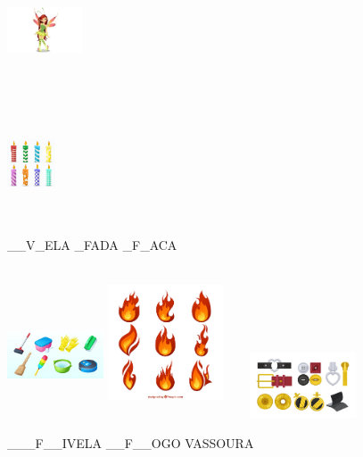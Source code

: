\includegraphics[width=0.87500in,height=1.40486in]{media/image8.jpeg}

\includegraphics[width=0.56250in,height=1.32083in]{media/image9.jpeg}

\_\_V\_ELA \_FADA \_F\_ACA

\includegraphics[width=1.12500in,height=1.48958in]{media/image10.jpeg}
\includegraphics[width=1.34375in,height=1.77083in]{media/image11.jpeg}
\includegraphics[width=1.77847in,height=0.76369in]{media/image12.jpeg}

\_\_\_F\_\_IVELA \_\_F\_\_OGO VASSOURA

